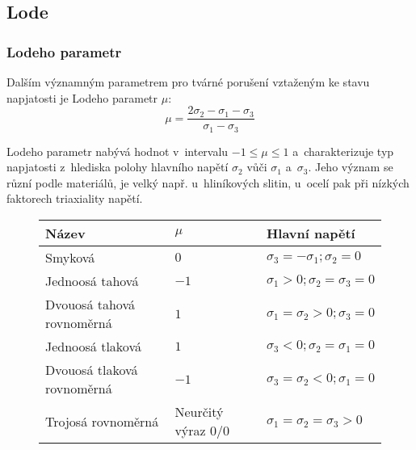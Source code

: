 
\subsection{Lode}
\subsubsection{Lodeho parametr}
Dalším významným parametrem pro tvárné porušení vztaženým ke stavu napjatosti je Lodeho parametr $\mu$:
\begin{equation}
	\mu = \frac{2 \sigma_2 - \sigma_1 - \sigma_3}{\sigma_1 - \sigma_3}
\end{equation}

Lodeho parametr nabývá hodnot v~intervalu $-1 \leq \mu \leq 1$ a~charakterizuje typ napjatosti z~hlediska polohy hlavního napětí $\sigma_2$ vůči $\sigma_1$ a~$\sigma_3$. Jeho význam se různí podle materiálů, je velký např. u~hliníkových slitin, u~ocelí pak při nízkých faktorech triaxiality napětí.
\begin{figure}[H]\centering\begin{tabular}{lll}
	\toprule
	Název            &       $\mu$        &     Hlavní napětí      \\ \midrule
	Smyková           &         $0$          &     $\sigma_3= -\sigma_1; \sigma_2=0$      \\
	Jednoosá tahová       &         $-1$         &     $\sigma_1>0; \sigma_2= \sigma_3=0$     \\
	Dvouosá tahová rovnoměrná  &         $1$          &     $\sigma_1=\sigma_2>0; \sigma_3=0$      \\
	Jednoosá tlaková      &         $1$          &     $\sigma_3<0; \sigma_2= \sigma_1=0$     \\
	Dvouosá tlaková rovnoměrná &         $-1$         &     $\sigma_3=\sigma_2<0; \sigma_1=0$      \\
	Trojosá rovnoměrná     & Neurčitý výraz $0/0$ & $\sigma_1=\sigma_2=\sigma_3>0$\\
\bottomrule
\end{tabular}\end{figure}

